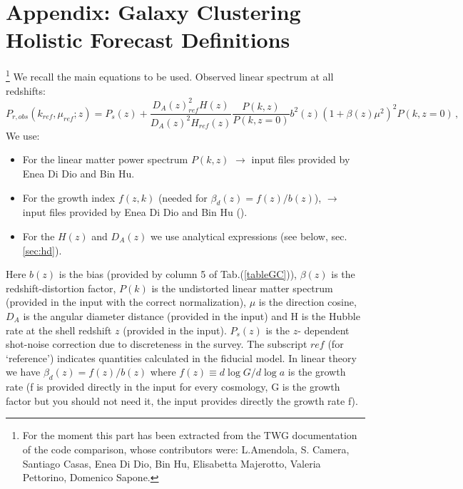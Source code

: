 \section*{Appendix: Galaxy Clustering Holistic Forecast Definitions}\footnote{For the moment this part has been extracted from the TWG documentation of the code comparison, whose contributors were: L.Amendola, S. Camera, Santiago Casas, Enea Di Dio, Bin Hu, Elisabetta Majerotto, Valeria Pettorino, Domenico Sapone.}
We recall the main equations to be used. Observed linear spectrum at all redshifts:
\begin{equation} \label{eq:observed-power}
P_{r,obs}(k_{ref},\mu_{ref};z)=P_{s}(z)+\frac{D_{A}(z)_{ref}^{2} H(z)}{D_A(z)^{2} H_{ref}(z)} \frac{P(k,z)}{P(k,z=0)} b^{2}(z) (1+\beta(z)\mu^{2})^{2}P(k,z=0)\,,
\end{equation}
We use:
\begin{itemize}
\item For the linear matter power spectrum $P(k,z)$ $\rightarrow$ input files provided by Enea Di Dio and Bin Hu. 
\item For the growth index $f(z,k)$ (needed for $\beta_{d}(z)=f(z)/b(z)$), $\rightarrow$ input files provided by Enea Di Dio and Bin Hu (). 
\item For the $H(z)$ and $D_A(z)$ we use analytical expressions (see below, sec. \ref{sec:hd}). 
\end{itemize}

Here $b(z)$ is the bias (provided by column 5 of Tab.(\ref{tableGC})), $\beta(z)$
is the redshift-distortion factor, $P(k)$ is the undistorted
linear matter spectrum (provided in the input with the correct normalization), $\mu$ is the
direction cosine, $D_A$ is the angular diameter distance (provided in the input)
and H is the Hubble rate at the shell redshift $z$ (provided in the input). 
$P_{s}(z)$  is the $z$- dependent shot-noise correction due to discreteness in the survey. 
The subscript $ref$ (for `reference') indicates
quantities calculated in the fiducial model. In linear theory we have
$\beta_{d}(z)=f(z)/b(z)$ where $f(z) \equiv d\log G/d\log a$ is the growth
rate (f is provided directly in the input for every cosmology, G is the growth factor but you should not need it, the input provides directly the growth rate f).


